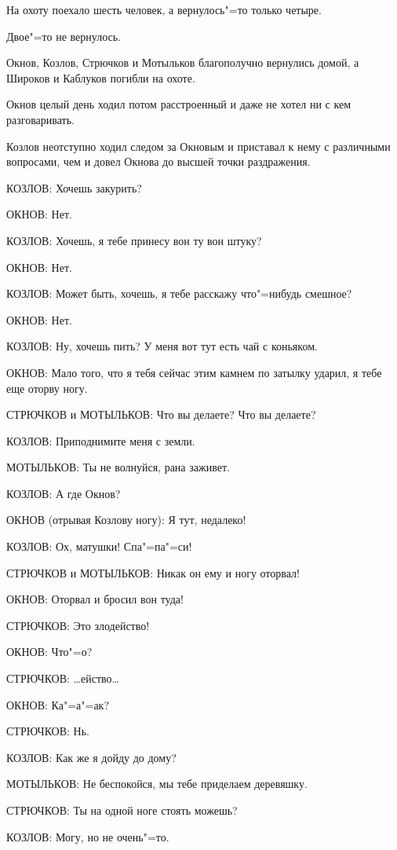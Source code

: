 На охоту поехало шесть человек, а вернулось"=то только четыре.

Двое"=то не вернулось.

Окнов, Козлов, Стрючков и Мотыльков благополучно вернулись домой, а Широков и Каблуков погибли на охоте.

Окнов целый день  ходил потом расстроенный и даже не хотел ни с кем  разговаривать.

Козлов неотступно ходил следом за Окновым и приставал к нему с различными вопросами, чем и довел Окнова до высшей точки раздражения.

КОЗЛОВ: Хочешь закурить?

ОКНОВ: Нет.

КОЗЛОВ: Хочешь, я тебе принесу вон ту вон штуку?

ОКНОВ: Нет.

КОЗЛОВ:  Может быть, хочешь, я тебе расскажу что"=нибудь смешное?

ОКНОВ: Нет.
    
КОЗЛОВ: Ну, хочешь пить? У меня вот тут есть чай с коньяком.
    
ОКНОВ: Мало того, что я тебя сейчас этим камнем по затылку ударил, я тебе еще оторву ногу.

СТРЮЧКОВ  и  МОТЫЛЬКОВ: Что вы делаете? Что вы делаете?
    
КОЗЛОВ: Приподнимите меня с земли.
    
МОТЫЛЬКОВ: Ты не волнуйся, рана заживет.
    
КОЗЛОВ: А где Окнов?
    
ОКНОВ (отрывая Козлову ногу): Я тут, недалеко!
    
КОЗЛОВ: Ох, матушки! Спа"=па"=си!
    
СТРЮЧКОВ и МОТЫЛЬКОВ: Никак он ему и ногу оторвал!
    
ОКНОВ: Оторвал и бросил вон туда!
    
СТРЮЧКОВ: Это злодейство!
    
ОКНОВ: Что"=о?
    
СТРЮЧКОВ: \dots ейство\dots
    
ОКНОВ: Ка"=а"=ак?
    
СТРЮЧКОВ: Нь.
    
КОЗЛОВ: Как же я дойду до дому?
    
МОТЫЛЬКОВ: Не беспокойся, мы тебе приделаем деревяшку.
    
СТРЮЧКОВ: Ты на одной ноге стоять можешь?
    
КОЗЛОВ: Могу, но не очень"=то.
    
